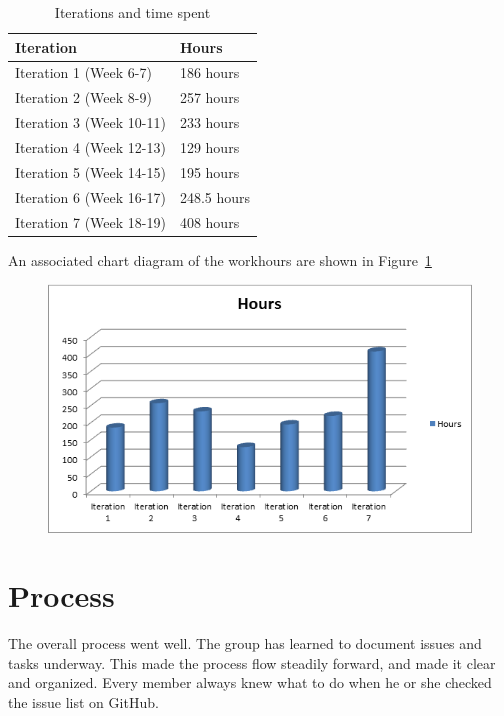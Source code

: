 	\begin{table}[H]
	\caption{Iterations and time spent}
	\centering
	\label{table:workhours}
	\begin{tabular}{|l|l|}
		\hline
			{\bf Iteration} & {\bf Hours}\\
		\hline
			Iteration 1 (Week 6-7) & 186 hours\\
		\hline
			Iteration 2 (Week 8-9) & 257 hours\\
		\hline
			Iteration 3 (Week 10-11) & 233 hours\\
		\hline
			Iteration 4 (Week 12-13) & 129 hours\\
		\hline
			Iteration 5 (Week 14-15) & 195 hours\\
		\hline
			Iteration 6 (Week 16-17) & 248.5 hours\\
		\hline
			Iteration 7 (Week 18-19) & 408 hours\\
		\hline
	\end{tabular}
	\end{table}

	An associated chart diagram of the workhours are shown in Figure~\ref{fig:workhours}

	\begin{figure}[H]
	\centering
	\label{fig:workhours}
	\includegraphics[scale=0.8]{images/workhours_chart2.png}
	\end{figure}



	\section{Process}
	The overall process went well. The group has learned to document issues and tasks underway. This made the process flow steadily forward, and made it clear and organized. Every member always knew what to do when he or she checked the issue list on GitHub.

